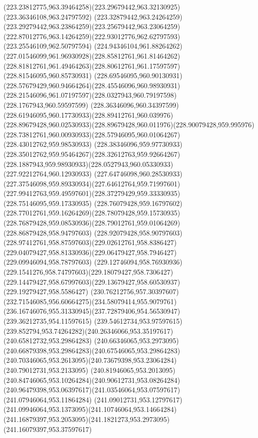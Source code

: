 {{		\curveto(223.23812775,963.39464258)(223.29679442,963.32130925)(223.36346108,963.24797592)
		\curveto(223.32879442,963.24264259)(223.29279442,963.23864259)(223.25679442,963.23064259)
		\curveto(222.87012776,963.14264259)(222.93012776,962.62797593)(223.25546109,962.50797594)
		\curveto(224.94346104,961.88264262)(227.01546099,961.96930928)(228.85812761,961.81464262)
		\curveto(228.81812761,961.49464263)(228.80612761,961.17597597)(228.81546095,960.85730931)
		\curveto(228.69546095,960.90130931)(228.57679429,960.94664264)(228.45546096,960.98930931)
		\curveto(228.21546096,961.07197597)(228.0327943,960.79197598)(228.1767943,960.59597599)
		\curveto(228.36346096,960.34397599)(228.61946095,960.17730933)(228.89412761,960.039976)
		\curveto(228.89679428,960.02530933)(228.89679428,960.011976)(228.90079428,959.995976)
		\curveto(228.73812761,960.00930933)(228.57946095,960.01064267)(228.43012762,959.98530933)
		\curveto(228.38346096,959.97730933)(228.35012762,959.95464267)(228.32612763,959.92664267)
		\curveto(228.1887943,959.98930933)(228.0527943,960.05330933)(227.92212764,960.12930933)
		\curveto(227.64746098,960.28530933)(227.37546098,959.89330934)(227.64612764,959.71997601)
		\curveto(227.99412763,959.49597601)(228.37279429,959.33330935)(228.75146095,959.17330935)
		\curveto(228.76079428,959.16797602)(228.77012761,959.16264269)(228.78079428,959.15730935)
		\curveto(228.76879428,959.08530936)(228.79012761,959.01064269)(228.86879428,958.94797603)
		\curveto(228.92079428,958.90797603)(228.97412761,958.87597603)(229.02612761,958.8386427)
		\curveto(229.04079427,958.81330936)(229.06479427,958.7946427)(229.09946094,958.78797603)
		\curveto(229.12746094,958.76930936)(229.1541276,958.74797603)(229.18079427,958.7306427)
		\curveto(229.14479427,958.67997603)(229.13679427,958.60530937)(229.19279427,958.5586427)
		\curveto(230.76212756,957.30397607)(232.71546085,956.60664275)(234.58079414,955.9079761)
		\curveto(236.16746076,955.31330945)(237.72879406,954.56530947)(239.36212735,954.11597615)
		\lineto(239.54612734,953.97597615)
		\curveto(239.852794,953.74264282)(240.26346066,953.35197617)(240.65812732,953.29864283)
		\curveto(240.66346065,953.2973095)(240.66879398,953.29864283)(240.67546065,953.29864283)
		\curveto(240.70346065,953.2613095)(240.73679398,953.23064284)(240.79012731,953.2133095)
		\curveto(240.81946065,953.2013095)(240.84746065,953.10264284)(240.90612731,953.08264284)
		\curveto(240.96479398,953.06397617)(241.03546064,953.07597617)(241.07946064,953.11864284)
		\curveto(241.09012731,953.12797617)(241.09946064,953.1373095)(241.10746064,953.14664284)
		\curveto(241.16879397,953.2053095)(241.1821273,953.2973095)(241.16079397,953.37597617)
}}
